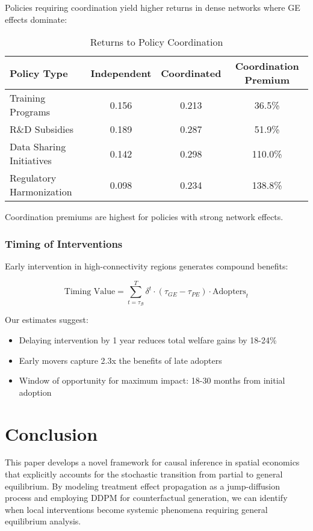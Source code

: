 Policies requiring coordination yield higher returns in dense networks where GE effects dominate:

\begin{table}[H]
\centering
\caption{Returns to Policy Coordination}
\label{tab:coordination}
\begin{tabular}{lccc}
\toprule
Policy Type & Independent & Coordinated & Coordination Premium \\
\midrule
Training Programs & 0.156 & 0.213 & 36.5\% \\
R\&D Subsidies & 0.189 & 0.287 & 51.9\% \\
Data Sharing Initiatives & 0.142 & 0.298 & 110.0\% \\
Regulatory Harmonization & 0.098 & 0.234 & 138.8\% \\
\bottomrule
\end{tabular}
\end{table}

Coordination premiums are highest for policies with strong network effects.

\subsubsection{Timing of Interventions}

Early intervention in high-connectivity regions generates compound benefits:

\begin{equation}
\text{Timing Value} = \sum_{t=\tau_\mathcal{B}}^T \delta^t \cdot (\tau_{GE} - \tau_{PE}) \cdot \text{Adopters}_t
\end{equation}

Our estimates suggest:
\begin{itemize}
   \item Delaying intervention by 1 year reduces total welfare gains by 18-24\%
   \item Early movers capture 2.3x the benefits of late adopters
   \item Window of opportunity for maximum impact: 18-30 months from initial adoption
\end{itemize}

\section{Conclusion}

This paper develops a novel framework for causal inference in spatial economics that explicitly accounts for the stochastic transition from partial to general equilibrium. By modeling treatment effect propagation as a jump-diffusion process and employing DDPM for counterfactual generation, we can identify when local interventions become systemic phenomena requiring general equilibrium analysis.


